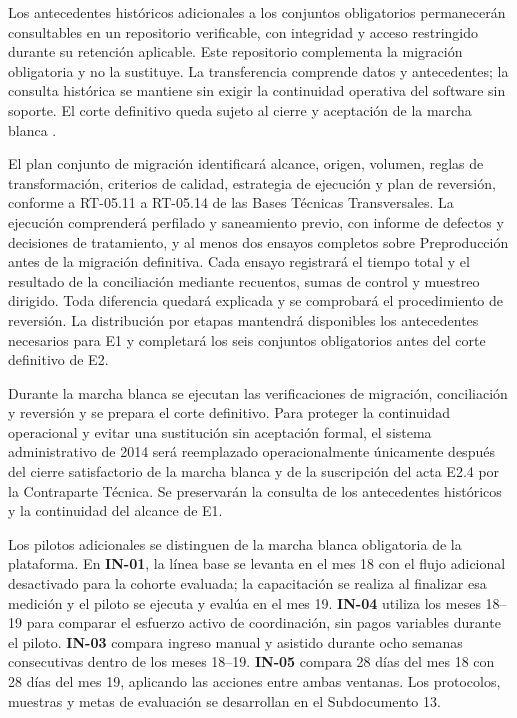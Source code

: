 \begin{itemize}
    Los antecedentes históricos adicionales a los conjuntos obligatorios permanecerán consultables en un repositorio verificable, con integridad y acceso restringido durante su retención aplicable. Este repositorio complementa la migración obligatoria y no la sustituye. La transferencia comprende datos y antecedentes; la consulta histórica se mantiene sin exigir la continuidad operativa del software sin soporte. El corte definitivo queda sujeto al cierre y aceptación de la marcha blanca \parencite[cap.~15, RT-05.10 y RT-05.15]{caso07}.

    El plan conjunto de migración identificará alcance, origen, volumen, reglas de transformación, criterios de calidad, estrategia de ejecución y plan de reversión, conforme a RT-05.11 a RT-05.14 de las Bases Técnicas Transversales. La ejecución comprenderá perfilado y saneamiento previo, con informe de defectos y decisiones de tratamiento, y al menos dos ensayos completos sobre Preproducción antes de la migración definitiva. Cada ensayo registrará el tiempo total y el resultado de la conciliación mediante recuentos, sumas de control y muestreo dirigido. Toda diferencia quedará explicada y se comprobará el procedimiento de reversión. La distribución por etapas mantendrá disponibles los antecedentes necesarios para E1 y completará los seis conjuntos obligatorios antes del corte definitivo de E2.

    Durante la marcha blanca se ejecutan las verificaciones de migración, conciliación y reversión y se prepara el corte definitivo. Para proteger la continuidad operacional y evitar una sustitución sin aceptación formal, el sistema administrativo de 2014 será reemplazado operacionalmente únicamente después del cierre satisfactorio de la marcha blanca y de la suscripción del acta E2.4 por la Contraparte Técnica. Se preservarán la consulta de los antecedentes históricos y la continuidad del alcance de E1.

    Los pilotos adicionales se distinguen de la marcha blanca obligatoria de la plataforma. En \textbf{IN-01}, la línea base se levanta en el mes 18 con el flujo adicional desactivado para la cohorte evaluada; la capacitación se realiza al finalizar esa medición y el piloto se ejecuta y evalúa en el mes 19. \textbf{IN-04} utiliza los meses 18--19 para comparar el esfuerzo activo de coordinación, sin pagos variables durante el piloto. \textbf{IN-03} compara ingreso manual y asistido durante ocho semanas consecutivas dentro de los meses 18--19. \textbf{IN-05} compara 28 días del mes 18 con 28 días del mes 19, aplicando las acciones entre ambas ventanas. Los protocolos, muestras y metas de evaluación se desarrollan en el Subdocumento 13.


\end{itemize}
